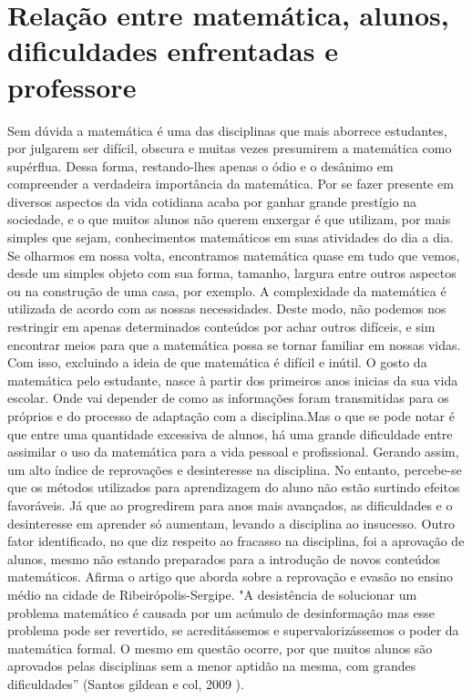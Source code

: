 \documentclass[12pt,a4paper]{article}
\begin{document}
\section{Relação entre matemática, alunos, dificuldades enfrentadas e professore}
Sem dúvida a matemática é uma das disciplinas que mais aborrece estudantes, por julgarem ser difícil, obscura e muitas vezes presumirem a matemática como supérflua. Dessa forma, restando-lhes apenas o ódio e o desânimo em compreender a verdadeira importância da matemática. 
Por se fazer presente em diversos aspectos da vida cotidiana acaba por ganhar grande prestígio na sociedade, e o que muitos alunos não querem enxergar é que utilizam, por mais simples que sejam, conhecimentos matemáticos em suas atividades do dia a dia. Se olharmos em nossa volta, encontramos matemática quase em tudo que vemos, desde um simples objeto com sua forma, tamanho, largura entre outros aspectos ou na construção de uma casa, por exemplo. 
A complexidade da matemática é utilizada de acordo com as nossas necessidades. Deste modo, não podemos nos restringir em apenas determinados conteúdos por achar outros difíceis, e sim encontrar meios para que a matemática possa se tornar familiar em nossas vidas. Com isso, excluindo a ideia de que matemática é difícil e inútil.
O gosto da matemática pelo estudante, nasce à partir dos primeiros anos inicias da sua vida escolar. Onde vai depender de como as informações foram transmitidas para os próprios e do processo de adaptação com a disciplina.Mas o que se pode notar é que entre uma quantidade excessiva de alunos, há uma grande dificuldade entre assimilar o uso da matemática para a vida pessoal e profissional. Gerando assim, um alto índice de reprovações e desinteresse na disciplina.
No entanto, percebe-se que os métodos utilizados para aprendizagem do aluno não estão surtindo efeitos favoráveis. Já que ao progredirem para anos mais avançados, as dificuldades e o desinteresse em aprender só aumentam, levando a disciplina ao insucesso.
Outro fator identificado, no que diz respeito ao fracasso na disciplina, foi a aprovação de alunos, mesmo não estando preparados para a introdução de novos conteúdos matemáticos. Afirma o artigo que aborda sobre a reprovação e evasão no ensino médio na cidade de Ribeirópolis-Sergipe.
"A desistência de solucionar um problema matemático é causada por um acúmulo de desinformação mas esse problema pode ser revertido, se acreditássemos e supervalorizássemos o poder da matemática formal. O mesmo em questão ocorre, por que muitos alunos são aprovados pelas disciplinas sem a menor aptidão na mesma, com grandes dificuldades” (Santos gildean e col, 2009 ).
\end{document}
